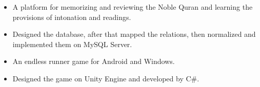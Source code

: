 \divider

\begin{itemize}
    \item A platform for memorizing and reviewing the Noble Quran and learning the provisions of intonation and readings.
    \item Designed the database, after that mapped the relations, then normalized and implemented them on MySQL Server.
\end{itemize}

\begin{itemize}
    \item An endless runner game for Android and Windows.
    \item Designed the game on Unity Engine and developed by C\#.
\end{itemize}
